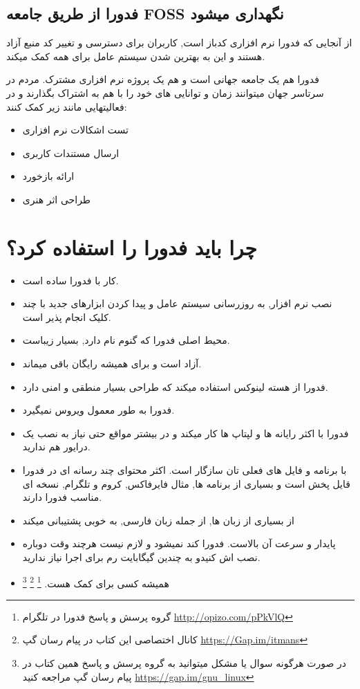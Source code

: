 \subsection{فدورا از طریق جامعه FOSS نگهداری میشود}\label{se-1172}
از آنجایی که فدورا نرم افزاری کدباز است, کاربران برای دسترسی و تغییر کد منبع آزاد هستند و این به بهترین شدن سیستم عامل برای همه کمک میکند.

فدورا هم یک جامعه جهانی است و هم یک پروژه نرم افزاری مشترک. مردم در سرتاسر جهان میتوانند زمان و توانایی های خود را با هم به اشتراک بگذارند و در فعالیتهایی مانند زیر کمک کنند:
\begin{itemize}
	\item تست اشکالات نرم افزاری
	\item ارسال مستندات کاربری
	\item ارائه بازخورد
	\item طراحی اثر هنری
\end{itemize}
\section{چرا باید فدورا را استفاده کرد؟}\label{se-118}
\begin{itemize}
	\item کار با فدورا ساده است.
	\item نصب نرم افزار, به روزرسانی سیستم عامل و پیدا کردن ابزارهای جدید با چند کلیک انجام پذیر است.
	\item محیط اصلی فدورا که گنوم نام دارد, بسیار زیباست.
	\item آزاد است و برای همیشه رایگان باقی میماند.
	\item فدورا از هسته لینوکس استفاده میکند که طراحی بسیار منطقی و امنی دارد.
	\item فدورا به طور معمول ویروس نمیگیرد.
	\item  فدورا با اکثر رایانه ها و لپتاپ ها کار میکند و در بیشتر مواقع حتی نیاز به نصب یک درایور هم ندارید.
	\item با برنامه و فایل های فعلی تان سازگار است. اکثر محتوای چند رسانه ای در فدورا قایل پخش است و بسیاری از برنامه ها, مثال فایرفاکس, کروم و تلگرام, نسخه ای مناسب فدورا دارند.
	\item از بسیاری از زبان ها, از جمله زبان فارسی, به خوبی پشتیبانی میکند
	\item پایدار و سرعت آن بالاست. فدورا کند نمیشود و لازم نیست هرچند وقت دوباره نصب اش کنیدو به چندین گیگابایت رم برای اجرا نیاز ندارید.
	\item همیشه کسی برای کمک هست. 
	\footnote{گروه پرسش و پاسخ فدورا در تلگرام
\href{https://t.me/joinchat/DSbv30PVmG2lrcJjsAhwCQ}{http://opizo.com/pPkVlQ}	
}
\footnote{کانال اختصاصی این کتاب در پیام رسان گپ
\href{https://Gap.im/itmans}{https://Gap.im/itmans}
}
      \footnote{در صورت هرگونه سوال یا مشکل میتوانید به گروه پرسش و پاسخ همین کتاب در پیام رسان گپ
	  مراجعه کنید
	  \href{https://gap.im/gnu\_linux}{https://gap.im/gnu\_linux}    
}
\end{itemize}
